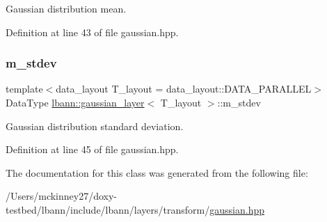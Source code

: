 Gaussian distribution mean. 

Definition at line 43 of file gaussian.\+hpp.

\mbox{\label{classlbann_1_1gaussian__layer_a42dc22c72a46ed4538b7776e24eb0a40}} 
\subsubsection{\texorpdfstring{m\+\_\+stdev}{m\_stdev}}
{\footnotesize\ttfamily template$<$data\+\_\+layout T\+\_\+layout = data\+\_\+layout\+::\+D\+A\+T\+A\+\_\+\+P\+A\+R\+A\+L\+L\+EL$>$ \\
Data\+Type \hyperlink{classlbann_1_1gaussian__layer}{lbann\+::gaussian\+\_\+layer}$<$ T\+\_\+layout $>$\+::m\+\_\+stdev\hspace{0.3cm}{\ttfamily [private]}}

Gaussian distribution standard deviation. 

Definition at line 45 of file gaussian.\+hpp.



The documentation for this class was generated from the following file\+:\begin{DoxyCompactItemize}
\item 
/\+Users/mckinney27/doxy-\/testbed/lbann/include/lbann/layers/transform/\hyperlink{gaussian_8hpp}{gaussian.\+hpp}\end{DoxyCompactItemize}
